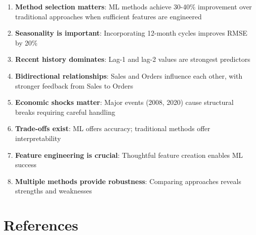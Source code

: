 \documentclass[12pt]{article}
\begin{document}
\begin{enumerate}
    \item \textbf{Method selection matters}: ML methods achieve 30-40\% improvement over traditional approaches when sufficient features are engineered

    \item \textbf{Seasonality is important}: Incorporating 12-month cycles improves RMSE by 20\%

    \item \textbf{Recent history dominates}: Lag-1 and lag-2 values are strongest predictors

    \item \textbf{Bidirectional relationships}: Sales and Orders influence each other, with stronger feedback from Sales to Orders

    \item \textbf{Economic shocks matter}: Major events (2008, 2020) cause structural breaks requiring careful handling

    \item \textbf{Trade-offs exist}: ML offers accuracy; traditional methods offer interpretability

    \item \textbf{Feature engineering is crucial}: Thoughtful feature creation enables ML success

    \item \textbf{Multiple methods provide robustness}: Comparing approaches reveals strengths and weaknesses
\end{enumerate}

\section*{\textbf{References}}
\end{document}
